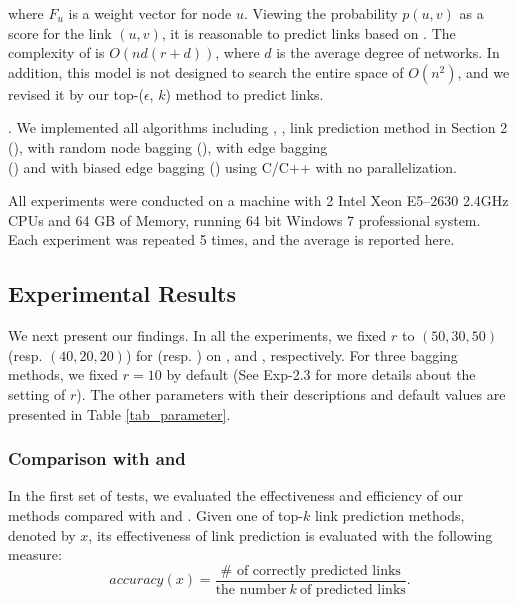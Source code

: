\noindent  where $F_u$ is a weight vector for node $u$. Viewing the probability $p(u, v)$ as
  a score for the link $(u, v)$, it is reasonable to predict links based on \BIGCLAM.
The complexity of  \BIGCLAM is $O(nd(r + d) )$, where $d$ is the average degree of networks.
  In addition, this model is not designed to search the entire space of $O( n^2 )$,
  and we revised it by our top-($\epsilon$, $k$) method to predict links.


.
We implemented all algorithms including \Aa, \BIGCLAM, link prediction method in Section 2 (\NMF),
\NMF with random node bagging (\Node), \NMF with  edge bagging \\ (\Edge) and
\NMF with biased edge bagging (\Biased) using C/C++ with no parallelization.

All experiments were conducted on a machine with 2 Intel Xeon
E5--2630 2.4GHz CPUs and 64 GB of Memory, running 64 bit
Windows 7 professional system. Each experiment was repeated 5 times,
and the average is reported here.



\subsection{Experimental Results}


We next present our findings. In all the experiments, we fixed $r$ to
$(50, 30, 50)$ (resp. $(40, 20, 20)$) for \NMF (resp. \BIGCLAM) on
\YouTube, \Flickr and \Wikipedia, respectively. For three bagging
methods, we fixed $r = 10$ by default (See Exp-2.3 for more details
about the setting of $r$). The other parameters with their
descriptions and default values are presented in Table \ref{tab_parameter}.




\subsubsection{Comparison with \Aa and \BIGCLAM }



In the first set of tests,
we evaluated the effectiveness and efficiency of our methods compared with \Aa and
\BIGCLAM. Given one of top-$k$ link prediction methods, denoted by $x$, its effectiveness
of link prediction is evaluated with the following measure:
\begin{equation}
accuracy(x) = \frac{\# \textrm{ of correctly predicted links}}{\textrm{the number} \ k\ \textrm{of predicted links}}.
\end{equation}

